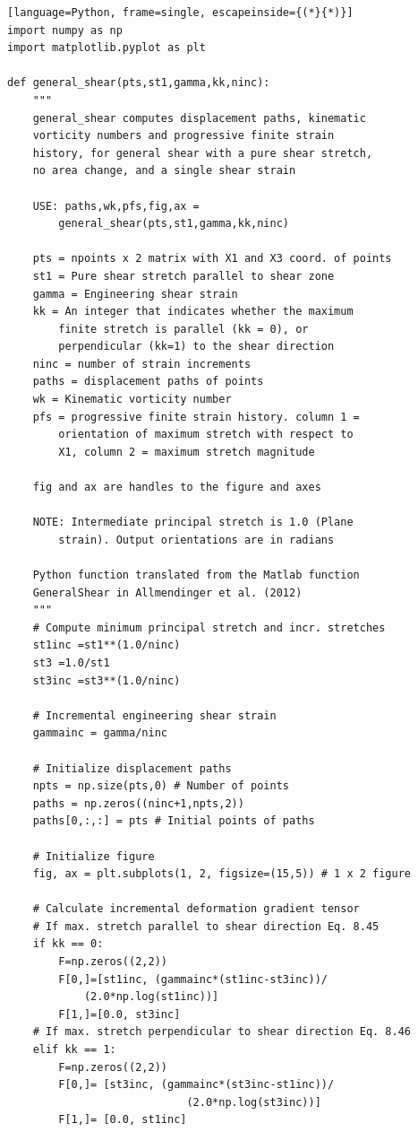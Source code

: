 \documentclass[a4paper , 12pt]{book}
\begin{document}
\begin{center}
\begin{lstlisting}[language=Python, frame=single, escapeinside={(*}{*)}]
import numpy as np
import matplotlib.pyplot as plt

def general_shear(pts,st1,gamma,kk,ninc):
	"""
	general_shear computes displacement paths, kinematic
	vorticity numbers and progressive finite strain 
	history, for general shear with a pure shear stretch,
	no area change, and a single shear strain
	
	USE: paths,wk,pfs,fig,ax = 
		general_shear(pts,st1,gamma,kk,ninc)
	
	pts = npoints x 2 matrix with X1 and X3 coord. of points
	st1 = Pure shear stretch parallel to shear zone
	gamma = Engineering shear strain
	kk = An integer that indicates whether the maximum 
		finite stretch is parallel (kk = 0), or 
		perpendicular (kk=1) to the shear direction
	ninc = number of strain increments
	paths = displacement paths of points
	wk = Kinematic vorticity number
	pfs = progressive finite strain history. column 1 =
		orientation of maximum stretch with respect to 
		X1, column 2 = maximum stretch magnitude
		
	fig and ax are handles to the figure and axes
	
	NOTE: Intermediate principal stretch is 1.0 (Plane
		strain). Output orientations are in radians
		
	Python function translated from the Matlab function
	GeneralShear in Allmendinger et al. (2012)
	"""
	# Compute minimum principal stretch and incr. stretches
	st1inc =st1**(1.0/ninc)
	st3 =1.0/st1
	st3inc =st3**(1.0/ninc)
	
	# Incremental engineering shear strain
	gammainc = gamma/ninc
	
	# Initialize displacement paths
	npts = np.size(pts,0) # Number of points
	paths = np.zeros((ninc+1,npts,2))
	paths[0,:,:] = pts # Initial points of paths
	
	# Initialize figure
	fig, ax = plt.subplots(1, 2, figsize=(15,5)) # 1 x 2 figure
	
	# Calculate incremental deformation gradient tensor
	# If max. stretch parallel to shear direction Eq. 8.45
	if kk == 0:
		F=np.zeros((2,2))
		F[0,]=[st1inc, (gammainc*(st1inc-st3inc))/
			(2.0*np.log(st1inc))]
		F[1,]=[0.0, st3inc]
	# If max. stretch perpendicular to shear direction Eq. 8.46
	elif kk == 1:
		F=np.zeros((2,2))
		F[0,]= [st3inc, (gammainc*(st3inc-st1inc))/
							(2.0*np.log(st3inc))]
		F[1,]= [0.0, st1inc]
	

\end{lstlisting}
\end{center}
\end{document}

